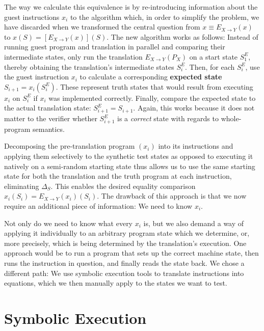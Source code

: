The way we calculate this equivalence is by re-introducing information about the guest instructions $x_i$ to the
algorithm which, in order to simplify the problem, we have discarded when we transformed the central question from $x
\equiv E_{X \rightarrow Y}(x)$ to $x(S) = [E_{X \rightarrow Y}(x)](S)$. The new algorithm works as follows: Instead of
running guest program and translation in parallel and comparing their intermediate states, only run the translation
$E_{X \rightarrow Y}(P_X)$ on a start state $S^E_1$, thereby obtaining the translation's intermediate states $S^E_i$.
Then, for each $S^E_i$, use the guest instruction $x_i$ to calculate a corresponding \textbf{expected state} $S_{i+1} =
x_i(S^E_i)$. These represent truth states that would result from executing $x_i$ on $S^E_i$ if $x_i$ was implemented
correctly. Finally, compare the expected state to the actual translation state: $S^E_{i+1} = S_{i+1}$. Again, this works
because it does not matter to the verifier whether $S^E_{i+1}$ is a \textit{correct} state with regards to whole-program
semantics.

Decomposing the pre-translation program $(x_i)$ into its instructions and applying them selectively to the synthetic
test states as opposed to executing it natively on a semi-random starting state thus allows us to use the same starting
state for both the translation and the truth program at each instruction, eliminating $\Delta_S$. This enables the
desired equality comparison $x_i(S_i) = E_{X \rightarrow Y}(x_i)(S_i)$. The drawback of this approach is that we now
require an additional piece of information: We need to know $x_i$.

Not only do we need to know what every $x_i$ is, but we also demand a way of applying it individually to an arbitrary
program state which we determine, or, more precisely, which is being determined by the translation's execution. One
approach would be to run a program that sets up the correct machine state, then runs the instruction in question, and
finally reads the state back. We chose a different path: We use symbolic execution tools to translate instructions into
equations, which we then manually apply to the states we want to test.

\section{Symbolic Execution}\label{sec:impl:symb_exec}

